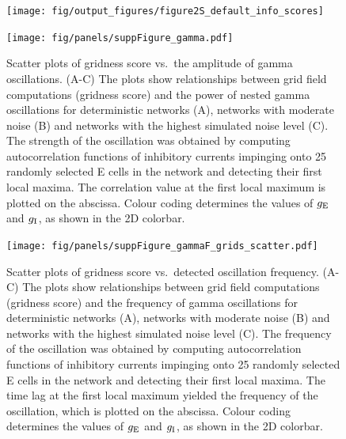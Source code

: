 \documentclass[a4paper,12pt]{article}
\newcommand{\ssc}[3]{\ensuremath{#1_{\text{#2}_{\text{#3}}}}}
\newcommand{\gE      }{\ssc{g}      {\scriptsize{E}}{}}
\newcommand{\gI      }{\ssc{g}      {\scriptsize{I}}{}}
\begin{document}
\clearpage

\begin{figure}[p]
    \internallinenumbers
    \centering
        \texttt{[image: fig/output\_figures/figure2S\_default\_info\_scores]}
    \caption{}
\end{figure}

\clearpage

\setcounter{figure}{0}
\renewcommand{\figurename}{Figure 3 - figure supplement}

\begin{figure}[p]
    \internallinenumbers
    \centering
        \texttt{[image: fig/panels/suppFigure\_gamma.pdf]}
    \caption{Scatter plots of gridness score vs.\ the amplitude of gamma
    oscillations. (A-C) The plots show relationships between grid field
    computations (gridness score) and the power of nested gamma oscillations
    for deterministic networks (A), networks with moderate noise (B) and
    networks with the highest simulated noise level (C).
    The strength of the oscillation was obtained
    by computing autocorrelation functions of inhibitory currents impinging
    onto 25 randomly selected E cells in the network and detecting their first
    local maxima. The correlation value at the first local maximum is plotted
    on the abscissa. Colour coding determines the values of $\gE$ and $\gI$, as
    shown in the 2D colorbar.}
\end{figure}

\clearpage

\begin{figure}[ht!]
    \internallinenumbers
    \centering
        \texttt{[image: fig/panels/suppFigure\_gammaF\_grids\_scatter.pdf]}
    \caption{Scatter plots of gridness score vs.\ detected oscillation
    frequency.  (A-C) The plots show relationships between grid field
    computations (gridness score) and the frequency of gamma oscillations for
    deterministic networks (A), networks with moderate noise (B) and networks
    with the highest simulated noise level (C).  The frequency of the
    oscillation was obtained by computing autocorrelation functions of
    inhibitory currents impinging onto 25 randomly selected E cells in the
    network and detecting their first local maxima.  The time lag at the first
    local maximum yielded the frequency of the oscillation, which is plotted on
    the abscissa. Colour coding determines the values of $\gE$ and $\gI$, as
    shown in the 2D colorbar.}
\end{figure}
\end{document}

